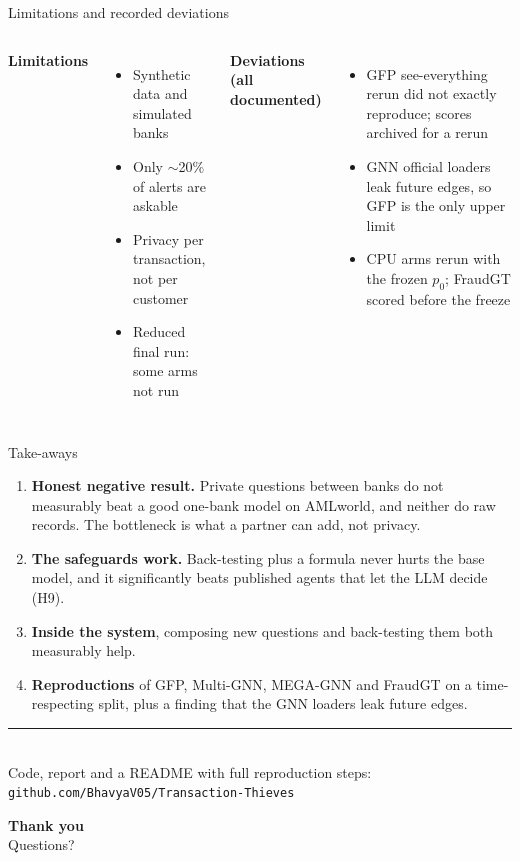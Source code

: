 \documentclass[aspectratio=169,11pt]{beamer}
\begin{document}
\begin{frame}{Limitations and recorded deviations}
\begin{columns}[t]
\textbf{\color{teal}Limitations}
\begin{itemize}\small
\item Synthetic data and simulated banks
\item Only $\sim$20\% of alerts are askable
\item Privacy per transaction, not per customer
\item Reduced final run: some arms not run
\end{itemize}
\textbf{\color{teal}Deviations (all documented)}
\begin{itemize}\small
\item GFP see-everything rerun did not exactly reproduce; scores archived for a rerun
\item GNN official loaders leak future edges, so GFP is the only upper limit
\item CPU arms rerun with the frozen $p_0$; FraudGT scored before the freeze
\end{itemize}
\end{columns}
\end{frame}

\begin{frame}{Take-aways}
\begin{enumerate}
\item<1-> \textbf{Honest negative result.} Private questions between banks do not measurably beat a good one-bank model on AMLworld, and neither do raw records. The bottleneck is what a partner can add, not privacy.
\item<1-> \textbf{The safeguards work.} Back-testing plus a formula never hurts the base model, and it significantly beats published agents that let the LLM decide (H9).
\item<1-> \textbf{Inside the system}, composing new questions and back-testing them both measurably help.
\item<1-> \textbf{Reproductions} of GFP, Multi-GNN, MEGA-GNN and FraudGT on a time-respecting split, plus a finding that the GNN loaders leak future edges.
\end{enumerate}
\vspace{8pt}
{\color{accent}\rule{\linewidth}{1pt}}\\[4pt]
\centering\footnotesize Code, report and a README with full reproduction steps:\\ \texttt{github.com/BhavyaV05/Transaction-Thieves}
\end{frame}

{
\begin{frame}
\centering\vspace{2cm}
{\fontsize{30}{34}\selectfont\bfseries Thank you}\\[10pt]
{\color{teal}Questions?}
\end{frame}}
\end{document}
